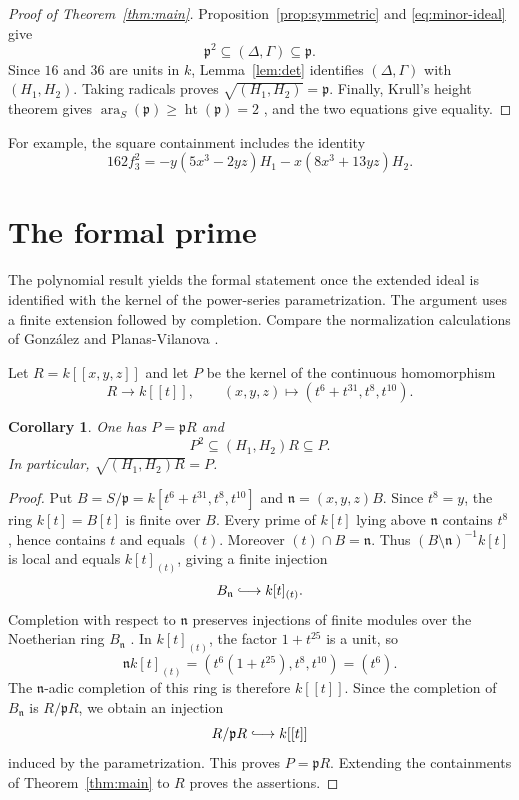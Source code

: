 \documentclass[11pt]{amsart}
\newtheorem{corollary}[theorem]{Corollary}
\theoremstyle{remark}
\DeclareMathOperator{\ara}{ara}
\begin{document}
\begin{proof}[Proof of Theorem~\ref{thm:main}]
Proposition~\ref{prop:symmetric} and \eqref{eq:minor-ideal} give
\[
 \mathfrak p^2\subseteq(\Delta,\Gamma)\subseteq\mathfrak p.
\]
Since $16$ and $36$ are units in $k$, Lemma~\ref{lem:det} identifies $(\Delta,\Gamma)$ with $(H_1,H_2)$. Taking radicals proves $\sqrt{(H_1,H_2)}=\mathfrak p$. Finally, Krull's height theorem gives $\ara_S(\mathfrak p)\geq\operatorname{ht}(\mathfrak p)=2$ \cite[Tag~0BBZ]{Stacks}, and the two equations give equality.
\end{proof}

For example, the square containment includes the identity
\[
 162f_3^2=-y(5x^3-2yz)H_1-x(8x^3+13yz)H_2.
\]

\section{The formal prime}\label{sec:formal}

The polynomial result yields the formal statement once the extended ideal is identified with the kernel of the power-series parametrization. The argument uses a finite extension followed by completion. Compare the normalization calculations of Gonz\'alez and Planas-Vilanova \cite[proof of Theorem~4.7, Steps~5--7]{GonzalezPlanas2026}.

Let $R=k[[x,y,z]]$ and let $P$ be the kernel of the continuous homomorphism
\[
 R\longrightarrow k[[t]],\qquad
 (x,y,z)\longmapsto(t^6+t^{31},t^8,t^{10}).
\]

\begin{corollary}\label{cor:formal}
One has $P=\mathfrak pR$ and
\[
 P^2\subseteq(H_1,H_2)R\subseteq P.
\]
In particular, $\sqrt{(H_1,H_2)R}=P$.
\end{corollary}

\begin{proof}
Put $B=S/\mathfrak p=k[t^6+t^{31},t^8,t^{10}]$ and $\mathfrak n=(x,y,z)B$. Since $t^8=y$, the ring $k[t]=B[t]$ is finite over $B$. Every prime of $k[t]$ lying above $\mathfrak n$ contains $t^8$, hence contains $t$ and equals $(t)$. Moreover $(t)\cap B=\mathfrak n$. Thus $(B\setminus\mathfrak n)^{-1}k[t]$ is local and equals $k[t]_{(t)}$, giving a finite injection
\[
 B_{\mathfrak n}\lhook\joinrel\longrightarrow k[t]_{(t)}.
\]
Completion with respect to $\mathfrak n$ preserves injections of finite modules over the Noetherian ring $B_{\mathfrak n}$ \cite[Tag~00MA]{Stacks}. In $k[t]_{(t)}$, the factor $1+t^{25}$ is a unit, so
\[
 \mathfrak n k[t]_{(t)}
 =(t^6(1+t^{25}),t^8,t^{10})=(t^6).
\]
The $\mathfrak n$-adic completion of this ring is therefore $k[[t]]$. Since the completion of $B_{\mathfrak n}$ is $R/\mathfrak pR$, we obtain an injection
\[
 R/\mathfrak pR\lhook\joinrel\longrightarrow k[[t]]
\]
induced by the parametrization. This proves $P=\mathfrak pR$. Extending the containments of Theorem~\ref{thm:main} to $R$ proves the assertions.
\end{proof}
\end{document}
